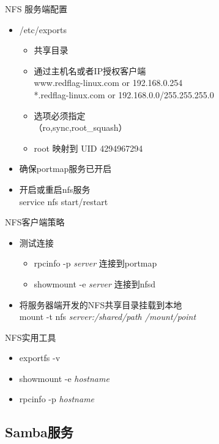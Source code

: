 \begin{frame}{NFS 服务端配置}


\begin{itemize}
\item /etc/exports

\begin{itemize}
\item 共享目录
\item 通过主机名或者IP授权客户端\\
www.redflag-linux.com or 192.168.0.254\\
{*}.redflag-linux.com or 192.168.0.0/255.255.255.0
\item 选项必须指定\\
（ro,sync,root\_squash）
\item root 映射到 UID 4294967294
\end{itemize}
\item 确保portmap服务已开启
\item 开启或重启nfs服务\\
service nfs start/restart
\end{itemize}

\end{frame} 
\begin{frame}{NFS客户端策略}


\begin{itemize}
\item 测试连接

\begin{itemize}
\item rpcinfo -p \emph{server} 连接到portmap
\item showmount -e \emph{server }连接到nfsd
\end{itemize}
\item 将服务器端开发的NFS共享目录挂载到本地\\
mount -t nfs \emph{server:/shared/path /mount/point}
\end{itemize}

\end{frame} 
\begin{frame}{NFS实用工具}
\begin{itemize}
\item exportfs -v
\item showmount -e \emph{hostname}
\item rpcinfo -p \emph{hostname}
\end{itemize}

\end{frame} 
\subsection{Samba服务}


